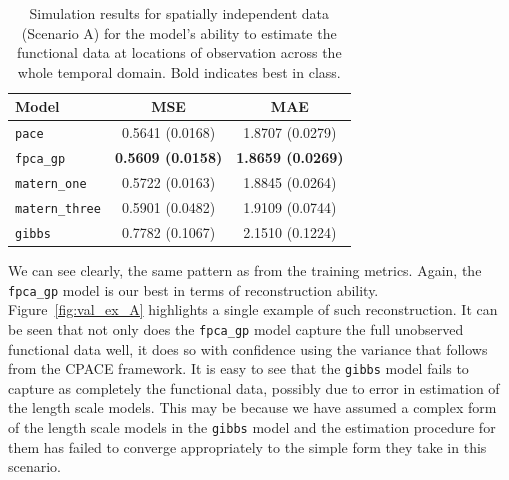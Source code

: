 \begin{table}
	\caption[Simulation results for Scenario A on validation data]{Simulation results for spatially independent data (Scenario A) for the model's ability to estimate the functional data at locations of observation across the whole temporal domain. Bold indicates best in class.}
	\centering
	\label{tab:val_A}
	\begin{tabular}{lcc}
		\toprule
		\textbf{Model} & \textbf{MSE} & \textbf{MAE} \\
		\midrule
		\verb*|pace| & 0.5641 (0.0168) & 1.8707	(0.0279) \\
		\verb*|fpca_gp| & \textbf{0.5609 (0.0158)} & \textbf{1.8659 (0.0269)} \\
		\verb*|matern_one| & 0.5722	(0.0163) & 1.8845 (0.0264) \\
		\verb*|matern_three| & 0.5901 (0.0482) & 1.9109	(0.0744) \\
		\verb*|gibbs| & 0.7782 (0.1067) & 2.1510 (0.1224)\\
		\bottomrule
	\end{tabular}
\end{table}

We can see clearly, the same pattern as from the training metrics. 
Again, the \verb*|fpca_gp| model is our best in terms of reconstruction ability.
Figure~\ref{fig:val_ex_A} highlights a single example of such reconstruction.
It can be seen that not only does the \verb*|fpca_gp| model capture the full unobserved functional data well, it does so with confidence using the variance that follows from the CPACE framework.
It is easy to see that the \verb*|gibbs| model fails to capture as completely the functional data, possibly due to error in estimation of the  length scale models.
This may be because we have assumed a complex form of the length scale models in the \verb*|gibbs| model and the estimation procedure for them has failed to converge appropriately to the simple form they take in this scenario.

